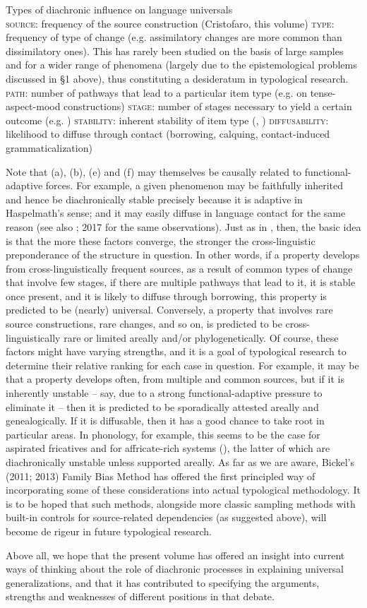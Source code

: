 \documentclass[output=paper]{langsci/langscibook}
\begin{document}
\ea
Types of diachronic influence on language universals\\
  \ea \textsc{source}: frequency of the source construction (Cristofaro, this volume)
  \ex \textsc{type}: frequency of type of change (e.g. assimilatory changes are more common than dissimilatory ones). This has rarely been studied on the basis of large samples and for a wider range of phenomena (largely due to the epistemological problems discussed in §1 above), thus constituting a desideratum in typological research.
  \ex \textsc{path}: number of pathways that lead to a particular item type (e.g. \citealt{BybeeEtAl1994} on tense-aspect-mood constructions)
  \ex \textsc{stage}: number of stages necessary to yield a certain outcome (e.g. \citealt{Harris2008})
  \ex \textsc{stability}: inherent stability of item type (\citealt{Greenberg1978}, \citealt{Nichols2003}) 
  \ex \textsc{diffusability:} likelihood to diffuse through contact (borrowing, calquing, contact-induced grammaticalization)
  \z
\z

Note that (a), (b), (e) and (f) may themselves be causally related to functional-adaptive forces. For example, a given phenomenon may be faithfully inherited and hence be diachronically stable precisely because it is adaptive in Haspelmath’s sense; and it may easily diffuse in language contact for the same reason (see also \citealt{Bickel2013}; 2017 for the same observations). 
Just as in \citet{Greenberg1978}, then, the basic idea is that the more these factors converge, the stronger the cross-linguistic preponderance of the structure in question. In other words, if a property develops from cross-linguistically frequent sources, as a result of common types of change that involve few stages, if there are multiple pathways that lead to it, it is stable once present, and it is likely to diffuse through borrowing, this property is predicted to be (nearly) universal. Conversely, a property that involves rare source constructions, rare changes, and so on, is predicted to be cross-linguistically rare or limited areally and/or phylogenetically. Of course, these factors might have varying strengths, and it is a goal of typological research to determine their relative ranking for each case in question. For example, it may be that a property develops often, from multiple and common sources, but if it is inherently unstable – say, due to a strong functional-adaptive pressure to eliminate it – then it is predicted to be sporadically attested areally and genealogically. If it is diffusable, then it has a good chance to take root in particular areas. In phonology, for example, this seems to be the case for aspirated fricatives \citep{Jacques2011} and for affricate-rich systems (\citealt{NikolaevGrossman2018}), the latter of which are diachronically unstable unless supported areally. As far as we are aware, Bickel’s (2011; 2013) Family Bias Method has offered the first principled way of incorporating some of these considerations into actual typological methodology. It is to be hoped that such methods, alongside more classic sampling methods with built-in controls for source-related dependencies (as suggested above), will become de rigeur in future typological research.

Above all, we hope that the present volume has offered an insight into current ways of thinking about the role of diachronic processes in explaining universal generalizations, and that it has contributed to specifying the arguments, strengths and weaknesses of different positions in that debate.

 
\end{document}
